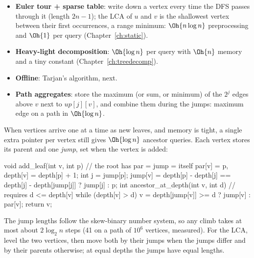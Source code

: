 
\begin{trick}
\begin{itemize}
  \item \textbf{Euler tour + sparse table}: write down a vertex every time the DFS passes through it (length $2n - 1$); the LCA of
        $u$ and $v$ is the shallowest vertex between their first occurrences, a range minimum: $\Oh{n \log n}$ preprocessing and
        $\Oh{1}$ per query (Chapter~\ref{ch:static}).
  \item \textbf{Heavy-light decomposition}: $\Oh{\log n}$ per query with $\Oh{n}$ memory and a tiny constant
        (Chapter~\ref{ch:treedecomp}).
  \item \textbf{Offline}: Tarjan's algorithm, next.
  \item \textbf{Path aggregates}: store the maximum (or sum, or minimum) of the $2^j$ edges above $v$ next to $\mathit{up}[j][v]$,
        and combine them during the jumps: maximum edge on a path in $\Oh{\log n}$.
\end{itemize}
\end{trick}

\begin{trick}
When vertices arrive one at a time as new leaves, and memory is tight, a single extra pointer per vertex still gives
$\Oh{\log n}$ ancestor queries. Each vertex stores its parent and one \emph{jump}, set when the vertex is added:
\begin{code}
void add_leaf(int v, int p) {  // the root has par = jump = itself
    par[v] = p, depth[v] = depth[p] + 1;
    int j = jump[p];
    jump[v] = depth[p] - depth[j] == depth[j] - depth[jump[j]] ? jump[j] : p;
}
int ancestor_at_depth(int v, int d) {  // requires d <= depth[v]
    while (depth[v] > d) v = depth[jump[v]] >= d ? jump[v] : par[v];
    return v;
}
\end{code}
The jump lengths follow the skew-binary number system, so any climb takes at most about $2\log_2 n$ steps (41 on a path of $10^6$
vertices, measured). For the LCA, level the two vertices, then move both by their jumps when the jumps differ and by their
parents otherwise; at equal depths the jumps have equal lengths.
\end{trick}


